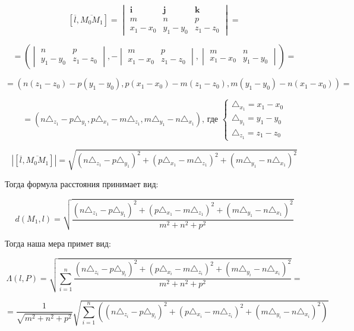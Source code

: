 $$[\overline{\mathit{l}}, \overline{M_0 M_1}] = \begin{vmatrix}
	\mathbf{i} & \mathbf{j} & \mathbf{k} \\
	m & n & p \\
	x_1 - x_0 & y_1 - y_0 & z_1 - z_0
\end{vmatrix} = $$

$$=\left(\begin{vmatrix}
	n & p \\
	y_1 - y_0 & z_1 - z_0
\end{vmatrix}, -\begin{vmatrix}
	m & p \\
	x_1 - x_0 & z_1 - z_0
\end{vmatrix}, \begin{vmatrix}
	m & n \\
	x_1 - x_0 & y_1 - y_0
\end{vmatrix}\right) = $$

$$= (n (z_1 - z_0) - p (y_1 - y_0), p (x_1 - x_0) - m (z_1 - z_0), m (y_1 - y_0) - n (x_1 - x_0)) = $$

$$ = (n \triangle_{z_1} - p \triangle_{y_1}, p \triangle_{x_1} - m \triangle_{z_1}, m \triangle_{y_1} - n \triangle_{x_1})\text{, где }\begin{cases}
	\triangle_{x_1} = x_1 - x_0 \\
	\triangle_{y_1} = y_1 - y_0 \\
	\triangle_{z_1} = z_1 - z_0
\end{cases}$$

$$|[\overline{\mathit{l}}, \overline{M_0 M_1}]| = \sqrt{(n \triangle_{z_1} - p \triangle_{y_1})^2 + (p \triangle_{x_1} - m \triangle_{z_1})^2 + (m \triangle_{y_1} - n \triangle_{x_1})^2}$$

Тогда формула расстояния принимает вид:

$$d (M_1, \mathit{l}) = \sqrt{\frac{(n \triangle_{z_1} - p \triangle_{y_1})^2 + (p \triangle_{x_1} - m \triangle_{z_1})^2 + (m \triangle_{y_1} - n \triangle_{x_1})^2}{m^2 + n^2 + p^2}}$$

Тогда наша мера примет вид:

$$\Lambda (\mathit{l}, P) = \sqrt{\underset{i=1}{\overset{n}{\sum}} \frac{(n \triangle_{z_i} - p \triangle_{y_i})^2 + (p \triangle_{x_i} - m \triangle_{z_i})^2 + (m \triangle_{y_i} - n \triangle_{x_i})^2}{m^2 + n^2 + p^2} } = $$

$$ = \frac{1}{\sqrt{m^2 + n^2 + p^2}} \sqrt{\underset{i=1}{\overset{n}{\sum}} \left( (n \triangle_{z_i} - p \triangle_{y_i})^2 + (p \triangle_{x_i} - m \triangle_{z_i})^2 + (m \triangle_{y_i} - n \triangle_{x_i})^2 \right)}$$


